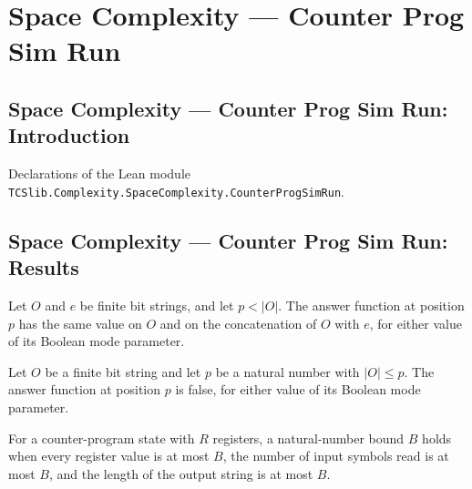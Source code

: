 \section{Space Complexity --- Counter Prog Sim Run}
\subsection*{Space Complexity --- Counter Prog Sim Run: Introduction}

Declarations of the Lean module \texttt{TCSlib.Complexity.SpaceComplexity.CounterProgSimRun}.

\subsection*{Space Complexity --- Counter Prog Sim Run: Results}

\begin{lemma}
\label{Complexity.CPSim.ans_append}
\leanok
{}
Let $O$ and $e$ be finite bit strings, and let $p<|O|$. The answer function at position
$p$ has the same value on $O$ and on the concatenation of $O$ with $e$, for either value
of its Boolean mode parameter.
\end{lemma}

\begin{lemma}
\label{Complexity.CPSim.ans_of_le}
\leanok
{}
Let $O$ be a finite bit string and let $p$ be a natural number with $|O|\le p$. The
answer function at position $p$ is false, for either value of its Boolean mode
parameter.
\end{lemma}

\begin{definition}
\label{Complexity.CPSim.Bd}
\leanok
{}
For a counter-program state with $R$ registers, a natural-number bound $B$ holds when
every register value is at most $B$, the number of input symbols read is at most $B$,
and the length of the output string is at most $B$.
\end{definition}

